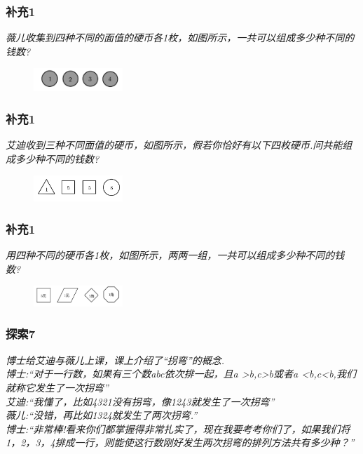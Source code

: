 \begin{frame}
    \frametitle{补充1}
    \textit{薇儿收集到四种不同的面值的硬币各1枚，如图所示，一共可以组成多少种不同的钱数?}
    \begin{figure}[H] 
        \centering
        \includegraphics[width=0.3\textwidth]{./pics/Chapter_2/buchong1_1.png}
    \end{figure}
\end{frame}

\begin{frame}
    \frametitle{补充1}
    \textit{艾迪收到三种不同面值的硬币，如图所示，假若你恰好有以下四枚硬币.问共能组成多少种不同的钱数?}
    \begin{figure}[H] 
        \centering
        \includegraphics[width=0.3\textwidth]{./pics/Chapter_2/buchong1_2.png}
    \end{figure}
\end{frame}

\begin{frame}
    \frametitle{补充1}
    \textit{用四种不同的硬币各1枚，如图所示，两两一组，一共可以组成多少种不同的钱数?}
    \begin{figure}[H] 
        \centering
        \includegraphics[width=0.3\textwidth]{./pics/Chapter_2/buchong1_3.png}
    \end{figure}
\end{frame}

\begin{frame}
    \frametitle{探索7}
    \textit{博士给艾迪与薇儿上课，课上介绍了``拐弯''的概念.\\
    博士:``对于一行数，如果有三个数abc依次排一起，且a >b,c>b或者a <b,c<b,我们就称它发生了一次拐弯''\\
    艾迪:``我懂了，比如4321没有拐弯，像1243就发生了一次拐弯''\\
    薇儿:``没错，再比如1324就发生了两次拐弯.''\\
    博士:``非常棒!看来你们都掌握得非常扎实了，现在我要考考你们了，如果我们将1，2，3，4排成一行，则能使这行数刚好发生两次拐弯的排列方法共有多少种？''}
\end{frame}

